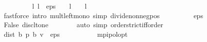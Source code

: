 \begin{isabellebody}
\ \ \ \ \isamarkupfalse%
\ \isamarkupfalse%
\ {\isachardoublequoteopen}{\isasymdots}\ {\isasymle}\ {\isacharparenleft}{\kern0pt}l{\isacharslash}{\kern0pt}\ {\isacharparenleft}{\kern0pt}{}{\isacharminus}{\kern0pt}l{\isacharparenright}{\kern0pt}{\isacharparenright}{\kern0pt}\ {\isacharasterisk}{\kern0pt}\ {\isacharparenleft}{\kern0pt}eps\ {\isacharasterisk}{\kern0pt}\ {\isacharparenleft}{\kern0pt}{}\ {\isacharminus}{\kern0pt}\ l{\isacharparenright}{\kern0pt}\ {\isacharslash}{\kern0pt}\ {\isacharparenleft}{\kern0pt}{}\ {\isacharasterisk}{\kern0pt}\ l{\isacharparenright}{\kern0pt}{\isacharparenright}{\kern0pt}{\isachardoublequoteclose}\isanewline
\ \ \ \ \ \ \isamarkupfalse%
\ {\isacharasterisk}{\kern0pt}{\isacharasterisk}{\kern0pt}\isanewline
\ \ \ \ \ \ \isamarkupfalse%
\ {\isacharparenleft}{\kern0pt}fastforce\ intro{\isacharbang}{\kern0pt}{\isacharcolon}{\kern0pt}\ mult{\isacharunderscore}{\kern0pt}left{\isacharunderscore}{\kern0pt}mono\ simp{\isacharcolon}{\kern0pt}\ divide{\isacharunderscore}{\kern0pt}nonneg{\isacharunderscore}{\kern0pt}pos{\isacharparenright}{\kern0pt}\isanewline
\ \ \ \ \isamarkupfalse%
\ \isamarkupfalse%
\ {\isachardoublequoteopen}{\isasymdots}\ {\isacharequal}{\kern0pt}\ eps\ {\isacharslash}{\kern0pt}\ {}{\isachardoublequoteclose}\isanewline
\ \ \ \ \ \ \isamarkupfalse%
\ False\ disc{\isacharunderscore}{\kern0pt}lt{\isacharunderscore}{\kern0pt}one\isanewline
\ \ \ \ \ \ \isamarkupfalse%
\ {\isacharparenleft}{\kern0pt}auto\ simp{\isacharcolon}{\kern0pt}\ order{\isachardot}{\kern0pt}strict{\isacharunderscore}{\kern0pt}iff{\isacharunderscore}{\kern0pt}order{\isacharparenright}{\kern0pt}\isanewline
\ \ \ \ \isamarkupfalse%
\ \isamarkupfalse%
\ {\isachardoublequoteopen}dist\ {\isacharparenleft}{\kern0pt}{\isasymnu}\isactrlsub b\ {\isacharquery}{\kern0pt}p{\isacharparenright}{\kern0pt}\ {\isacharparenleft}{\kern0pt}{\isasymL}\isactrlsub b\ {\isacharquery}{\kern0pt}v{\isacharparenright}{\kern0pt}\ {\isasymle}\ eps\ {\isacharslash}{\kern0pt}\ {}{\isachardoublequoteclose}\isacommand{{\isachardot}{\kern0pt}}\isamarkupfalse%
\ \ \ \ \isanewline
\ \ \isamarkupfalse%
\isanewline
{}\isamarkupfalse%
%
\endisatagproof
{\isafoldproof}%
%
\isadelimproof
\isanewline
%
\endisadelimproof
\isanewline
{}\isamarkupfalse%
\ mpi{\isacharunderscore}{\kern0pt}pol{\isacharunderscore}{\kern0pt}opt{\isacharcolon}{\kern0pt}\isanewline

\end{isabellebody}
